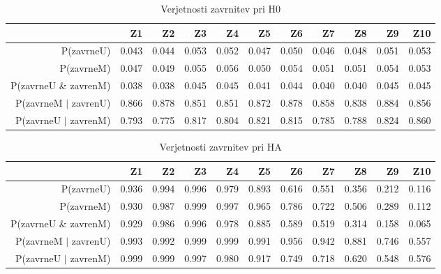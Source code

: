 \documentclass[letterpaper,11pt]{article}
\begin{document}
\begin{table}[ht]
\centering
\begin{tabular}{rrrrrrrrrrr}
  \hline
 & Z1 & Z2 & Z3 & Z4 & Z5 & Z6 & Z7 & Z8 & Z9 & Z10 \\ 
  \hline
P(zavrneU) & 0.043 & 0.044 & 0.053 & 0.052 & 0.047 & 0.050 & 0.046 & 0.048 & 0.051 & 0.053 \\ 
  P(zavrneM) & 0.047 & 0.049 & 0.055 & 0.056 & 0.050 & 0.054 & 0.051 & 0.051 & 0.054 & 0.053 \\ 
  P(zavrneU \& zavrenM) & 0.038 & 0.038 & 0.045 & 0.045 & 0.041 & 0.044 & 0.040 & 0.040 & 0.045 & 0.045 \\ 
  P(zavrneM $|$ zavrenU) & 0.866 & 0.878 & 0.851 & 0.851 & 0.872 & 0.878 & 0.858 & 0.838 & 0.884 & 0.856 \\ 
  P(zavrneU $|$ zavrenM) & 0.793 & 0.775 & 0.817 & 0.804 & 0.821 & 0.815 & 0.785 & 0.788 & 0.824 & 0.860 \\ 
   \hline
\end{tabular}
\caption{Verjetnosti zavrnitev pri H0} 
\label{table:6}
\end{table}
\begin{table}[ht]
\centering
\begin{tabular}{rrrrrrrrrrr}
  \hline
 & Z1 & Z2 & Z3 & Z4 & Z5 & Z6 & Z7 & Z8 & Z9 & Z10 \\ 
  \hline
P(zavrneU) & 0.936 & 0.994 & 0.996 & 0.979 & 0.893 & 0.616 & 0.551 & 0.356 & 0.212 & 0.116 \\ 
  P(zavrneM) & 0.930 & 0.987 & 0.999 & 0.997 & 0.965 & 0.786 & 0.722 & 0.506 & 0.289 & 0.112 \\ 
  P(zavrneU \& zavrenM) & 0.929 & 0.986 & 0.996 & 0.978 & 0.885 & 0.589 & 0.519 & 0.314 & 0.158 & 0.065 \\ 
  P(zavrneM $|$ zavrenU) & 0.993 & 0.992 & 0.999 & 0.999 & 0.991 & 0.956 & 0.942 & 0.881 & 0.746 & 0.557 \\ 
  P(zavrneU $|$ zavrenM) & 0.999 & 0.999 & 0.997 & 0.980 & 0.917 & 0.749 & 0.718 & 0.620 & 0.548 & 0.576 \\ 
   \hline
\end{tabular}
\caption{Verjetnosti zavrnitev pri HA} 
\label{table:7}
\end{table}

\newpage
\end{document}
